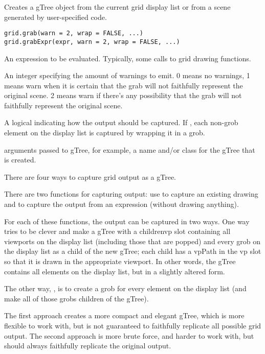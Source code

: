 %
\begin{Description}\relax
Creates a gTree object from the current grid display list
or from a scene generated by user-specified code.
\end{Description}
%
\begin{Usage}
\begin{verbatim}
grid.grab(warn = 2, wrap = FALSE, ...)
grid.grabExpr(expr, warn = 2, wrap = FALSE, ...)
\end{verbatim}
\end{Usage}
%
\begin{Arguments}
\begin{ldescription}
\item[\code{expr}]  An expression to be evaluated.  Typically,
some calls to grid drawing functions. 
\item[\code{warn}]  An integer specifying the amount of warnings
to emit.  0 means no warnings, 1 means warn when it is
certain that the grab will not faithfully represent the
original scene. 2 means warn if there's any possibility
that the grab will not faithfully represent the
original scene.

\item[\code{wrap}]  A logical indicating how the output should
be captured. If , each non-grob element on the
display list is captured by wrapping it in a grob.  

\item[\code{...}]  arguments passed to gTree, for example, a
name and/or class for the gTree that is created.
\end{ldescription}
\end{Arguments}
%
\begin{Details}\relax
There are four ways to capture grid output as a gTree.

There are two functions for capturing output:
use  to capture an existing drawing
and  to capture the output from
an expression (without drawing anything).

For each of these functions, the output can be captured in
two ways.  One way tries to be clever and make a
gTree with a childrenvp slot containing all viewports on
the display list (including those
that are popped) and every
grob on the display list as a child of the new
gTree;  each child has a vpPath in the vp slot so that it is
drawn in the appropriate viewport.
In other words, the gTree contains all elements on the display
list, but in a slightly altered form.

The other way, ,
is to create a grob for every element on the
display list (and make all of those grobs children of the
gTree).

The first approach creates a more compact and elegant gTree,
which is more flexible to work with,
but is not guaranteed to faithfully replicate all possible
grid output.  The second approach is more brute force, and
harder to work with, but
should always faithfully replicate the original output.
\end{Details}
